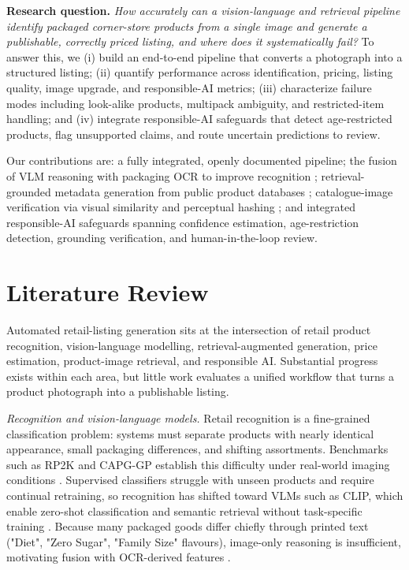 \documentclass[conference]{IEEEtran}
\begin{document}
\textbf{Research question.} \textit{How accurately can a vision-language and
retrieval pipeline identify packaged corner-store products from a single image
and generate a publishable, correctly priced listing, and where does it
systematically fail?} To answer this, we (i) build an end-to-end pipeline that
converts a photograph into a structured listing; (ii) quantify performance
across identification, pricing, listing quality, image upgrade, and
responsible-AI metrics; (iii) characterize failure modes including look-alike
products, multipack ambiguity, and restricted-item handling; and (iv) integrate
responsible-AI safeguards that detect age-restricted products, flag unsupported
claims, and route uncertain predictions to review.

Our contributions are: a fully integrated, openly documented pipeline; the
fusion of VLM reasoning with packaging OCR to improve recognition
\cite{ocrfusion2023}; retrieval-grounded metadata generation from public product
databases \cite{li2024modict}; catalogue-image verification via visual
similarity and perceptual hashing \cite{sir2020,eclip2022}; and integrated
responsible-AI safeguards spanning confidence estimation, age-restriction
detection, grounding verification, and human-in-the-loop review.

\section{Literature Review}

Automated retail-listing generation sits at the intersection of retail product
recognition, vision-language modelling, retrieval-augmented generation, price
estimation, product-image retrieval, and responsible AI. Substantial progress
exists within each area, but little work evaluates a unified workflow that turns
a product photograph into a publishable listing.

\textit{Recognition and vision-language models.} Retail recognition is a
fine-grained classification problem: systems must separate products with nearly
identical appearance, small packaging differences, and shifting assortments.
Benchmarks such as RP2K and CAPG-GP establish this difficulty under real-world
imaging conditions \cite{peng2020rp2k,geng2018oneshot}. Supervised classifiers
struggle with unseen products and require continual retraining, so recognition
has shifted toward VLMs such as CLIP, which enable zero-shot classification and
semantic retrieval without task-specific training \cite{radford2021clip}.
Because many packaged goods differ chiefly through printed text ("Diet",
"Zero Sugar", "Family Size" flavours), image-only reasoning is
insufficient, motivating fusion with OCR-derived features \cite{ocrfusion2023}.
\end{document}
